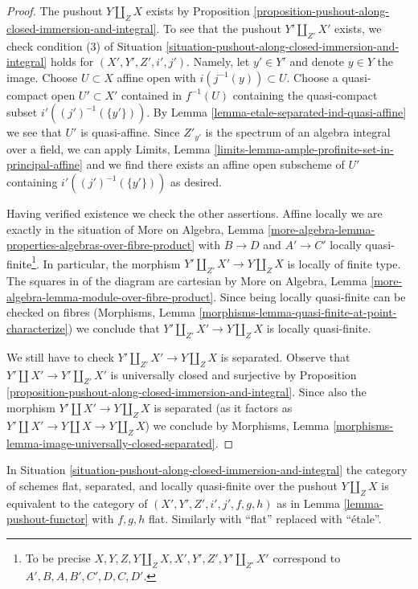 \begin{proof}
The pushout $Y \amalg_Z X$ exists by
Proposition \ref{proposition-pushout-along-closed-immersion-and-integral}.
To see that the pushout $Y' \amalg_{Z'} X'$ exists, we check
condition (3) of
Situation \ref{situation-pushout-along-closed-immersion-and-integral}
holds for $(X', Y', Z', i', j')$.
Namely, let $y' \in Y'$ and denote $y \in Y$ the image.
Choose $U \subset X$ affine open with $i(j^{-1}(y)) \subset U$.
Choose a quasi-compact open $U' \subset X'$ contained in
$f^{-1}(U)$ containing the quasi-compact subset $i'((j')^{-1}(\{y'\}))$.
By Lemma \ref{lemma-etale-separated-ind-quasi-affine}
we see that $U'$ is quasi-affine. Since $Z'_{y'}$ is the spectrum
of an algebra integral over a field, we can apply
Limits, Lemma \ref{limits-lemma-ample-profinite-set-in-principal-affine}
and we find there exists an affine open subscheme of $U'$ containing
$i'((j')^{-1}(\{y'\}))$ as desired.

\medskip\noindent
Having verified existence we check the other assertions.
Affine locally we are exactly in the situation of More on Algebra, Lemma
\ref{more-algebra-lemma-properties-algebras-over-fibre-product}
with $B \to D$ and $A' \to C'$ locally quasi-finite\footnote{To be precise
$X, Y, Z, Y \amalg_Z X, X', Y', Z', Y' \amalg_{Z'} X'$
correspond to $A', B, A, B', C', D, C, D'$.}.
In particular, the morphism $Y' \amalg_{Z'} X' \to Y \amalg_Z X$ is locally
of finite type. The squares in of the diagram are cartesian by
More on Algebra, Lemma \ref{more-algebra-lemma-module-over-fibre-product}.
Since being locally quasi-finite can be checked on fibres
(Morphisms, Lemma \ref{morphisms-lemma-quasi-finite-at-point-characterize})
we conclude that $Y' \amalg_{Z'} X' \to Y \amalg_Z X$
is locally quasi-finite.

\medskip\noindent
We still have to check $Y' \amalg_{Z'} X' \to Y \amalg_Z X$ is separated.
Observe that $Y' \amalg X' \to Y' \amalg_{Z'} X'$ is universally closed
and surjective by 
Proposition \ref{proposition-pushout-along-closed-immersion-and-integral}.
Since also the morphism $Y' \amalg X' \to Y \amalg_Z X$ is separated
(as it factors as $Y' \amalg X' \to Y \amalg X \to Y \amalg_Z X$)
we conclude by
Morphisms, Lemma \ref{morphisms-lemma-image-universally-closed-separated}.
\end{proof}

\begin{lemma}
\label{lemma-pushout-functor-equivalence-flat}
In Situation \ref{situation-pushout-along-closed-immersion-and-integral}
the category of schemes flat, separated, and locally quasi-finite
over the pushout $Y \amalg_Z X$ is equivalent to the category of
$(X', Y', Z', i', j', f, g, h)$ as in Lemma \ref{lemma-pushout-functor}
with $f, g, h$ flat. Similarly with ``flat'' replaced with
``\'etale''.
\end{lemma}

